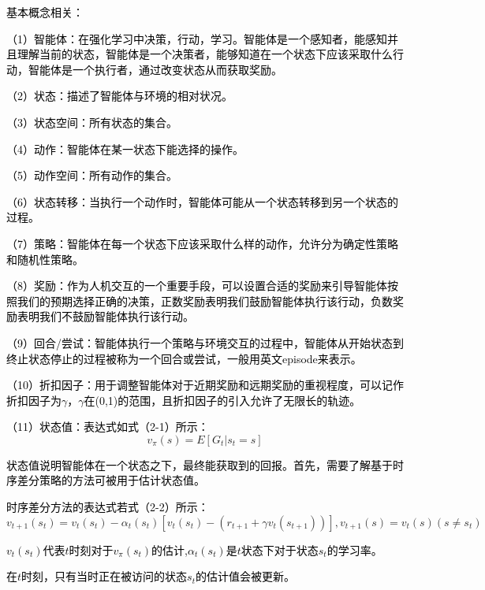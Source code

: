 \textcolor{black}{基本概念相关：}

\textcolor{black}{（1）智能体：在强化学习中决策，行动，学习。智能体是一个感知者，能感知并且理解当前的状态，智能体是一个决策者，能够知道在一个状态下应该采取什么行动，智能体是一个执行者，通过改变状态从而获取奖励。}

\textcolor{black}{（2）状态：描述了智能体与环境的相对状况。}

\textcolor{black}{（3）状态空间：所有状态的集合。}

\textcolor{black}{（4）动作：智能体在某一状态下能选择的操作。}

\textcolor{black}{（5）动作空间：所有动作的集合。}

\textcolor{black}{（6）状态转移：当执行一个动作时，智能体可能从一个状态转移到另一个状态的过程。}

\textcolor{black}{（7）策略：智能体在每一个状态下应该采取什么样的动作，允许分为确定性策略和随机性策略。}

\textcolor{black}{（8）奖励：作为人机交互的一个重要手段，可以设置合适的奖励来引导智能体按照我们的预期选择正确的决策，正数奖励表明我们鼓励智能体执行该行动，负数奖励表明我们不鼓励智能体执行该行动。}

\textcolor{black}{（9）回合/尝试：智能体执行一个策略与环境交互的过程中，智能体从开始状态到终止状态停止的过程被称为一个回合或尝试，一般用英文episode来表示。}

\textcolor{black}{（10）折扣因子：用于调整智能体对于近期奖励和远期奖励的重视程度，可以记作折扣因子为$\gamma$，$\gamma$在(0,1)的范围，且折扣因子的引入允许了无限长的轨迹。}

\textcolor{black}{（11）状态值：表达式如式（2-1）所示：}
\begin{equation}
v_{\pi}(s)=E[G_{t}|s_{t}=s]
\end{equation}

\textcolor{black}{状态值说明智能体在一个状态之下，最终能获取到的回报。首先，需要了解基于时序差分策略的方法可被用于估计状态值。}

\textcolor{black}{时序差分方法的表达式若式（2-2）所示：}
\begin{equation}
v_{t+1}(s_{t})  =v_{t}(s_{t})-\alpha_{t}(s_{t})[v_{t}(s_{t})-(r_{t+1}+\gamma v_{t}(s_{t+1}))],
v_{t+1}(s)=v_{t}(s)(s\neq s_{t})
\end{equation}

\textcolor{black}{$v_{t}(s_{t})$代表$t$时刻对于$v_{\pi}(s_{t})$的估计,${\alpha_{t}(s_{t})}$是$t$状态下对于状态$s_{t}$的学习率。}

\textcolor{black}{在$t$时刻，只有当时正在被访问的状态$s_{t}$的估计值会被更新。}

